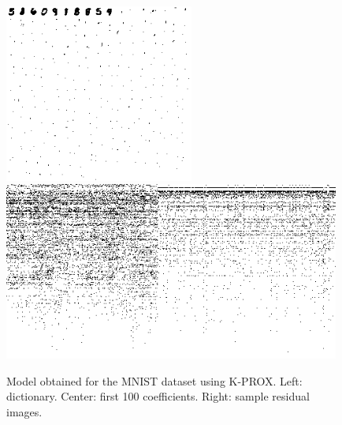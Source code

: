 \documentclass[twocolumn]{IEEEtran}
\theoremstyle{definition}
\begin{document}
\begin{figure}
\centering\includegraphics[height=2.3in]{fig/mnist_kprox_dict.png}\hspace{2ex}%
\includegraphics[height=2.3in]{fig/mnist_kprox_coef_crop.png}%
\caption{\label{fig:mnist-kprox} Model obtained for the MNIST dataset using K-PROX. Left: dictionary. Center: first 100 coefficients. Right: sample residual images. }
\end{figure}
%
%
\end{document}
